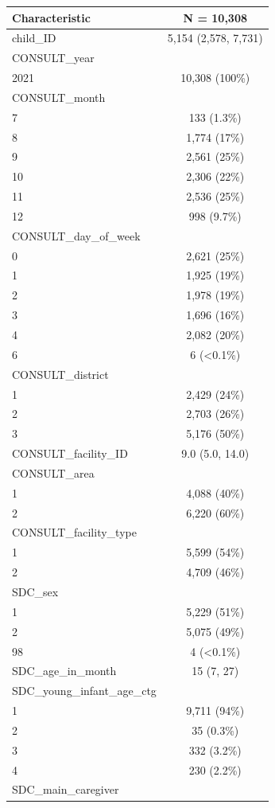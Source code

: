\documentclass[
  letterpaper,
  DIV=11,
  numbers=noendperiod]{scrreprt}
\begin{document}
\begin{longtable}[]{@{}lc@{}}
\toprule()
\textbf{Characteristic} & \textbf{N = 10,308} \\
\midrule()
\endhead
child\_ID & 5,154 (2,578, 7,731) \\
CONSULT\_year & \\
2021 & 10,308 (100\%) \\
CONSULT\_month & \\
7 & 133 (1.3\%) \\
8 & 1,774 (17\%) \\
9 & 2,561 (25\%) \\
10 & 2,306 (22\%) \\
11 & 2,536 (25\%) \\
12 & 998 (9.7\%) \\
CONSULT\_day\_of\_week & \\
0 & 2,621 (25\%) \\
1 & 1,925 (19\%) \\
2 & 1,978 (19\%) \\
3 & 1,696 (16\%) \\
4 & 2,082 (20\%) \\
6 & 6 (\textless0.1\%) \\
CONSULT\_district & \\
1 & 2,429 (24\%) \\
2 & 2,703 (26\%) \\
3 & 5,176 (50\%) \\
CONSULT\_facility\_ID & 9.0 (5.0, 14.0) \\
CONSULT\_area & \\
1 & 4,088 (40\%) \\
2 & 6,220 (60\%) \\
CONSULT\_facility\_type & \\
1 & 5,599 (54\%) \\
2 & 4,709 (46\%) \\
SDC\_sex & \\
1 & 5,229 (51\%) \\
2 & 5,075 (49\%) \\
98 & 4 (\textless0.1\%) \\
SDC\_age\_in\_month & 15 (7, 27) \\
SDC\_young\_infant\_age\_ctg & \\
1 & 9,711 (94\%) \\
2 & 35 (0.3\%) \\
3 & 332 (3.2\%) \\
4 & 230 (2.2\%) \\
SDC\_main\_caregiver & \\

\end{longtable}
\end{document}
